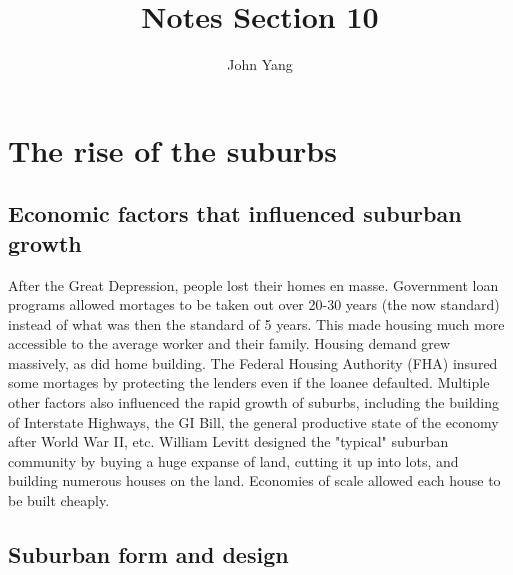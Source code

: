 \documentclass{article}
\title{Notes Section 10} %
\author{John Yang}
\begin{document}
    \maketitle
    \tableofcontents
    \section{The rise of the suburbs}
    \subsection{Economic factors that influenced suburban growth}
    \begin{outline}
        \1 After the Great Depression, people lost their homes en masse. Government loan programs allowed mortages to be taken out over 20-30 years (the now standard) instead of what was then the standard of 5 years. This made housing much more accessible to the average worker and their family. Housing demand grew massively, as did home building. 
        \1 The Federal Housing Authority (FHA) insured some mortages by protecting the lenders even if the loanee defaulted. Multiple other factors also influenced the rapid growth of suburbs, including the building of Interstate Highways, the GI Bill, the general productive state of the economy after World War II, etc. 
        \1 William Levitt designed the "typical" suburban community by buying a huge expanse of land, cutting it up into lots, and building numerous houses on the land. Economies of scale allowed each house to be built cheaply. 
    \end{outline}
    \subsection{Suburban form and design}
    \begin{outline}
        \1 
    \end{outline}
\end{document}
